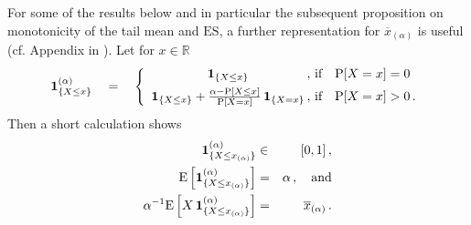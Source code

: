 \documentclass[11pt,a4paper,leqno]{article}
\begin{document}
For some of the results below and in particular the subsequent proposition on
monotonicity 
of the tail mean and $\mathrm{ES}$, a further
representation for $\overline{x}_{(\alpha)}$ is useful (cf. Appendix in
\cite{ANS}). Let 
for $x \in \mathbb{R}$
\begin{equation}
\label{eq:repfunc}
{\bf 1}_{\{X\leq x\}}^{(\alpha)}\quad  =\quad
\left\{
\begin{array}{c@{\,,\ }l}
{\bf 1}_{\{X\leq x\}} & \mbox{if}\quad \mathrm{P}[X=x] = 0\\[1ex]
{\bf 1}_{\{X\leq x\}} 
+
\frac{\alpha -\mathrm{P}[X\le x] }{\mathrm{P}[X=x]} 
\,{\bf 1}_{\{X = x\}} & \mbox{if}\quad \mathrm{P}[X=x] > 0\,.
\end{array}
\right.
\end{equation}
Then a short calculation shows
\begin{eqnarray}
{\bf 1}_{\{X\leq x_{(\alpha)}\}}^{(\alpha)} & \in & [0,1]\,,
\label{in01}\\
\label{E=alpha}
\mathrm{E}\left[{\bf 1}_{\{X\leq x_{(\alpha)}\}}^{(\alpha)}\right]& =& \alpha\,,\quad \mbox{and}\\
 \label{repr}
\alpha^{-1} \mathrm{E}\left[ X \,{\bf 1}_{\{X\leq x_{(\alpha)}\}}^{(\alpha)}\right] & = & \overline{x}_{(\alpha)}\,.
\end{eqnarray}
 
\end{document}
